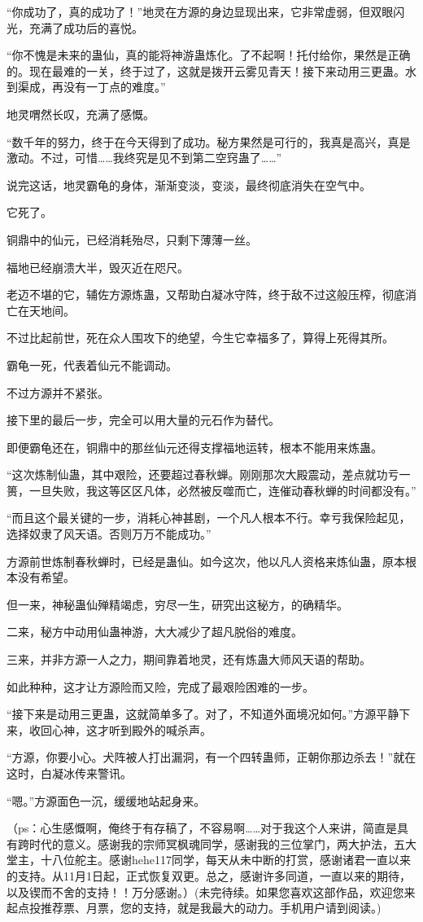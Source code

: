 \begin{this_body}
“你成功了，真的成功了！”地灵在方源的身边显现出来，它非常虚弱，但双眼闪光，充满了成功后的喜悦。

“你不愧是未来的蛊仙，真的能将神游蛊炼化。了不起啊！托付给你，果然是正确的。现在最难的一关，终于过了，这就是拨开云雾见青天！接下来动用三更蛊。水到渠成，再没有一丁点的难度。”

地灵喟然长叹，充满了感慨。

“数千年的努力，终于在今天得到了成功。秘方果然是可行的，我真是高兴，真是激动。不过，可惜……我终究是见不到第二空窍蛊了……”

说完这话，地灵霸龟的身体，渐渐变淡，变淡，最终彻底消失在空气中。

它死了。

铜鼎中的仙元，已经消耗殆尽，只剩下薄薄一丝。

福地已经崩溃大半，毁灭近在咫尺。

老迈不堪的它，辅佐方源炼蛊，又帮助白凝冰守阵，终于敌不过这般压榨，彻底消亡在天地间。

不过比起前世，死在众人围攻下的绝望，今生它幸福多了，算得上死得其所。

霸龟一死，代表着仙元不能调动。

不过方源并不紧张。

接下里的最后一步，完全可以用大量的元石作为替代。

即便霸龟还在，铜鼎中的那丝仙元还得支撑福地运转，根本不能用来炼蛊。

“这次炼制仙蛊，其中艰险，还要超过春秋蝉。刚刚那次大殿震动，差点就功亏一篑，一旦失败，我这等区区凡体，必然被反噬而亡，连催动春秋蝉的时间都没有。”

“而且这个最关键的一步，消耗心神甚剧，一个凡人根本不行。幸亏我保险起见，选择奴隶了风天语。否则万万不能成功。”

方源前世炼制春秋蝉时，已经是蛊仙。如今这次，他以凡人资格来炼仙蛊，原本根本没有希望。

但一来，神秘蛊仙殚精竭虑，穷尽一生，研究出这秘方，的确精华。

二来，秘方中动用仙蛊神游，大大减少了超凡脱俗的难度。

三来，并非方源一人之力，期间靠着地灵，还有炼蛊大师风天语的帮助。

如此种种，这才让方源险而又险，完成了最艰险困难的一步。

“接下来是动用三更蛊，这就简单多了。对了，不知道外面境况如何。”方源平静下来，收回心神，这才听到殿外的喊杀声。

“方源，你要小心。犬阵被人打出漏洞，有一个四转蛊师，正朝你那边杀去！”就在这时，白凝冰传来警讯。

“嗯。”方源面色一沉，缓缓地站起身来。

（ps：心生感慨啊，俺终于有存稿了，不容易啊……对于我这个人来讲，简直是具有跨时代的意义。感谢我的宗师冥枫魂同学，感谢我的三位掌门，两大护法，五大堂主，十八位舵主。感谢hehe117同学，每天从未中断的打赏，感谢诸君一直以来的支持。从11月1日起，正式恢复双更。总之，感谢许多同道，一直以来的期待，以及锲而不舍的支持！！万分感谢。）(未完待续。如果您喜欢这部作品，欢迎您来起点投推荐票、月票，您的支持，就是我最大的动力。手机用户请到阅读。)

\end{this_body}

